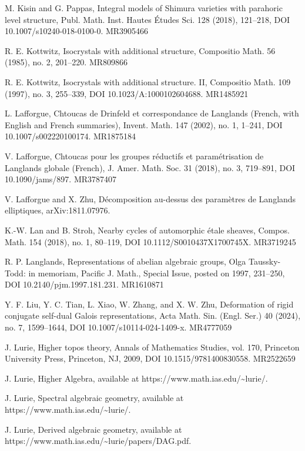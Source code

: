 \begin{refs}
\item[{[45]}] M. Kisin and G. Pappas, Integral models of Shimura varieties with parahoric level structure, Publ. Math. Inst. Hautes \'Etudes Sci. 128 (2018), 121--218, DOI 10.1007/s10240-018-0100-0. MR3905466
\item[{[46]}] R. E. Kottwitz, Isocrystals with additional structure, Compositio Math. 56 (1985), no. 2, 201--220. MR809866
\item[{[47]}] R. E. Kottwitz, Isocrystals with additional structure. II, Compositio Math. 109 (1997), no. 3, 255--339, DOI 10.1023/A:1000102604688. MR1485921
\item[{[48]}] L. Lafforgue, Chtoucas de Drinfeld et correspondance de Langlands (French, with English and French summaries), Invent. Math. 147 (2002), no. 1, 1--241, DOI 10.1007/s002220100174. MR1875184
\item[{[49]}] V. Lafforgue, Chtoucas pour les groupes r\'eductifs et param\'etrisation de Langlands globale (French), J. Amer. Math. Soc. 31 (2018), no. 3, 719--891, DOI 10.1090/jams/897. MR3787407
\item[{[50]}] V. Lafforgue and X. Zhu, D\'ecomposition au-dessus des param\`etres de Langlands elliptiques, arXiv:1811.07976.
\item[{[51]}] K.-W. Lan and B. Stroh, Nearby cycles of automorphic \'etale sheaves, Compos. Math. 154 (2018), no. 1, 80--119, DOI 10.1112/S0010437X1700745X. MR3719245
\item[{[52]}] R. P. Langlands, Representations of abelian algebraic groups, Olga Taussky-Todd: in memoriam, Pacific J. Math., Special Issue, posted on 1997, 231--250, DOI 10.2140/pjm.1997.181.231. MR1610871
\item[{[53]}] Y. F. Liu, Y. C. Tian, L. Xiao, W. Zhang, and X. W. Zhu, Deformation of rigid conjugate self-dual Galois representations, Acta Math. Sin. (Engl. Ser.) 40 (2024), no. 7, 1599--1644, DOI 10.1007/s10114-024-1409-x. MR4777059
\item[{[54]}] J. Lurie, Higher topos theory, Annals of Mathematics Studies, vol. 170, Princeton University Press, Princeton, NJ, 2009, DOI 10.1515/9781400830558. MR2522659
\item[{[55]}] J. Lurie, Higher Algebra, available at https://www.math.ias.edu/\textasciitilde lurie/.
\item[{[56]}] J. Lurie, Spectral algebraic geometry, available at https://www.math.ias.edu/\textasciitilde lurie/.
\item[{[57]}] J. Lurie, Derived algebraic geometry, available at https://www.math.ias.edu/\textasciitilde lurie/papers/DAG.pdf.

\end{refs}

